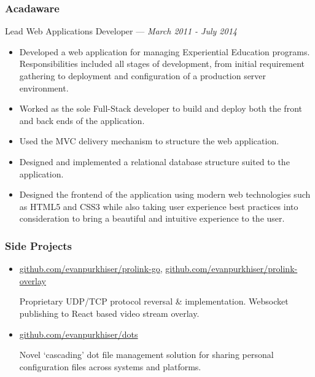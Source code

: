 \documentclass[letterpaper,10pt]{article}
\begin{document}
\subsubsection{Acadaware}
\hfill Lead Web Applications Developer --- \emph{March 2011 - July 2014}

\begin{itemize}
\tightlist{}
\item
  Developed a web application for managing Experiential Education
  programs. Responsibilities included all stages of development, from initial
  requirement gathering to deployment and configuration of a production server
  environment.
\item
  Worked as the sole Full-Stack developer to build and deploy both the front
  and back ends of the application.
\item
  Used the MVC delivery mechanism to structure the web application.
\item
  Designed and implemented a relational database structure suited to the
  application.
\item
  Designed the frontend of the application using modern web technologies such
  as HTML5 and CSS3 while also taking user experience best practices into
  consideration to bring a beautiful and intuitive experience to the user.
\end{itemize}

\subsubsection{Side Projects}

\begin{itemize}
\item
  \href{https://github.com/evanpurkhiser/prolink-go}{github.com/evanpurkhiser/prolink-go},
  \href{https://github.com/evanpurkhiser/prolink-overlay}{github.com/evanpurkhiser/prolink-overlay}

  Proprietary UDP/TCP protocol reversal \& implementation. Websocket
  publishing to React based video stream overlay.
\item
  \href{https://github.com/evanpurkhiser/dots}{github.com/evanpurkhiser/dots}

  Novel `cascading' dot file management solution for sharing personal
  configuration files across systems and platforms.
\end{itemize}
\end{document}
